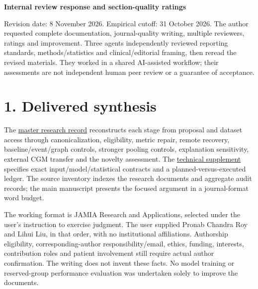 \documentclass[11pt,a4paper]{article}
\begin{document}
{\raggedright{}\LARGE\bfseries Internal review response and section-quality ratings\par}
\vspace{8pt}
Revision date: 8 November 2026. Empirical cutoff: 31 October 2026. The author requested complete documentation, journal-quality writing, multiple reviewers, ratings and improvement. Three agents independently reviewed reporting standards, methods/statistics and clinical/editorial framing, then reread the revised materials. They worked in a shared AI-assisted workflow; their assessments are not independent human peer review or a guarantee of acceptance.

\section*{1. Delivered synthesis}
The \href{../docs/research_master_record_2026_11_08.md}{master research record} reconstructs each stage from proposal and dataset access through canonicalization, eligibility, metric repair, remote recovery, baseline/event/graph controls, stronger pooling controls, explanation sensitivity, external CGM transfer and the novelty assessment. The \href{supplementary_methods.md}{technical supplement} specifies exact input/model/statistical contracts and a planned-versus-executed ledger. The source inventory indexes the research documents and aggregate audit records; the main manuscript presents the focused argument in a journal-format word budget.

The working format is JAMIA Research and Applications, selected under the user's instruction to exercise judgment. The user supplied Pronab Chandra Roy and Lihui Liu, in that order, with no institutional affiliations. Authorship eligibility, corresponding-author responsibility/email, ethics, funding, interests, contribution roles and patient involvement still require actual author confirmation. The writing does not invent these facts. No model training or reserved-group performance evaluation was undertaken solely to improve the documents.
\end{document}
